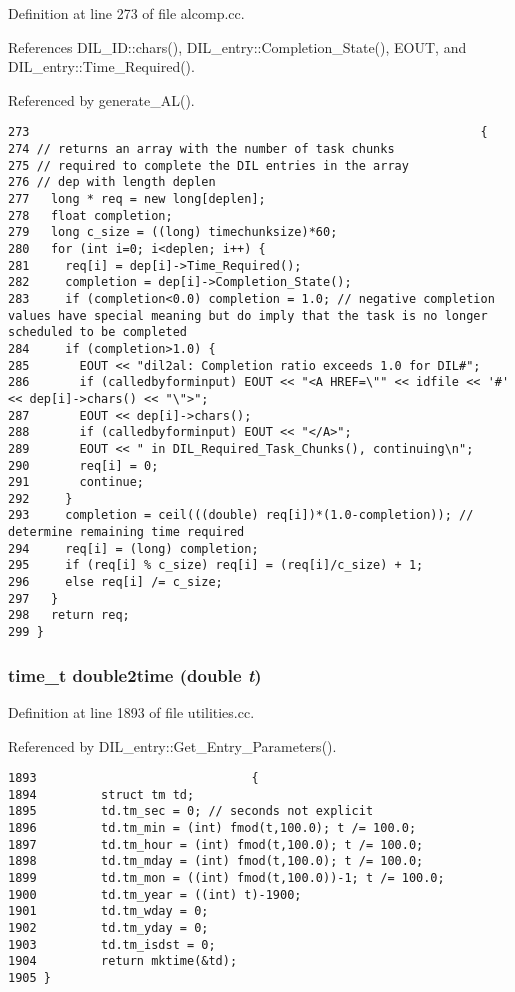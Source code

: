 Definition at line 273 of file alcomp.cc.

References DIL\_\-ID::chars(), DIL\_\-entry::Completion\_\-State(), EOUT, and DIL\_\-entry::Time\_\-Required().

Referenced by generate\_\-AL().



\footnotesize\begin{verbatim}273                                                               {
274 // returns an array with the number of task chunks
275 // required to complete the DIL entries in the array
276 // dep with length deplen
277   long * req = new long[deplen];
278   float completion;
279   long c_size = ((long) timechunksize)*60;
280   for (int i=0; i<deplen; i++) {
281     req[i] = dep[i]->Time_Required();
282     completion = dep[i]->Completion_State();
283     if (completion<0.0) completion = 1.0; // negative completion values have special meaning but do imply that the task is no longer scheduled to be completed
284     if (completion>1.0) {
285       EOUT << "dil2al: Completion ratio exceeds 1.0 for DIL#";
286       if (calledbyforminput) EOUT << "<A HREF=\"" << idfile << '#' << dep[i]->chars() << "\">";
287       EOUT << dep[i]->chars();
288       if (calledbyforminput) EOUT << "</A>";
289       EOUT << " in DIL_Required_Task_Chunks(), continuing\n";
290       req[i] = 0;
291       continue;
292     }
293     completion = ceil(((double) req[i])*(1.0-completion)); // determine remaining time required
294     req[i] = (long) completion;
295     if (req[i] % c_size) req[i] = (req[i]/c_size) + 1;
296     else req[i] /= c_size;
297   }
298   return req;
299 }
\end{verbatim}\normalsize 
{}
\subsubsection{\setlength{\rightskip}{0pt plus 5cm}time\_\-t double2time (double {\em t})}\label{dil2al_8hh_a225}




Definition at line 1893 of file utilities.cc.

Referenced by DIL\_\-entry::Get\_\-Entry\_\-Parameters().



\footnotesize\begin{verbatim}1893                              {
1894         struct tm td;
1895         td.tm_sec = 0; // seconds not explicit
1896         td.tm_min = (int) fmod(t,100.0); t /= 100.0;
1897         td.tm_hour = (int) fmod(t,100.0); t /= 100.0;
1898         td.tm_mday = (int) fmod(t,100.0); t /= 100.0;
1899         td.tm_mon = ((int) fmod(t,100.0))-1; t /= 100.0;
1900         td.tm_year = ((int) t)-1900;
1901         td.tm_wday = 0;
1902         td.tm_yday = 0;
1903         td.tm_isdst = 0;
1904         return mktime(&td);
1905 }
\end{verbatim}\normalsize 
{}
